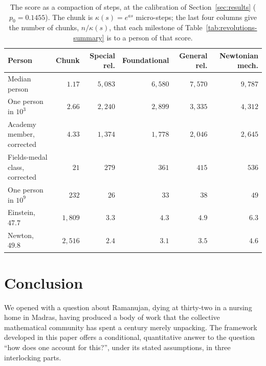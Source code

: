 \documentclass{article}
\begin{document}
\begin{table}[ht]
  \centering
  \caption{The score as a compaction of steps, at the calibration of Section~\ref{sec:results} ($p_0 = 0.1455$). The chunk is $\kappa(s) = e^{as}$ micro-steps; the last four columns give the number of chunks, $n/\kappa(s)$, that each milestone of Table~\ref{tab:revolutions-summary} is to a person of that score.}
  \label{tab:chunks}
  \medskip\small\setlength{\tabcolsep}{4pt}
  \begin{tabular}{l r r r r r}
    \hline
    Person & Chunk & Special rel. & Foundational & General rel. & Newtonian mech. \\
    \hline
    Median person & $1.17$ & $5{,}083$ & $6{,}580$ & $7{,}570$ & $9{,}787$ \\
    One person in $10^{3}$ & $2.66$ & $2{,}240$ & $2{,}899$ & $3{,}335$ & $4{,}312$ \\
    Academy member, corrected & $4.33$ & $1{,}374$ & $1{,}778$ & $2{,}046$ & $2{,}645$ \\
    Fields-medal class, corrected & $21$ & $279$ & $361$ & $415$ & $536$ \\
    One person in $10^{9}$ & $232$ & $26$ & $33$ & $38$ & $49$ \\
    Einstein, $47.7$ & $1{,}809$ & $3.3$ & $4.3$ & $4.9$ & $6.3$ \\
    Newton, $49.8$ & $2{,}516$ & $2.4$ & $3.1$ & $3.5$ & $4.6$ \\
    \hline
  \end{tabular}
\end{table}

\section{Conclusion}\label{sec:conclusion}

We opened with a question about Ramanujan, dying at thirty-two in a
nursing home in Madras, having produced a body of work that the
collective mathematical community has spent a century merely
unpacking. The framework developed in this paper offers a conditional, quantitative answer to the question ``how does one account for this?'', under its stated assumptions, in three interlocking parts.
\end{document}

